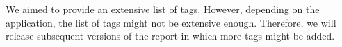 \documentclass[twoside,twocolumn,9pt]{extarticle}
\theoremstyle{plain}
\begin{document}
We aimed to provide an extensive list of tags. However, depending on the application, the list of tags might not be extensive enough. Therefore, we will release subsequent versions of the report \autocite{degelder2019scenariocategories} in which more tags might be added. 









%	

\end{document}
